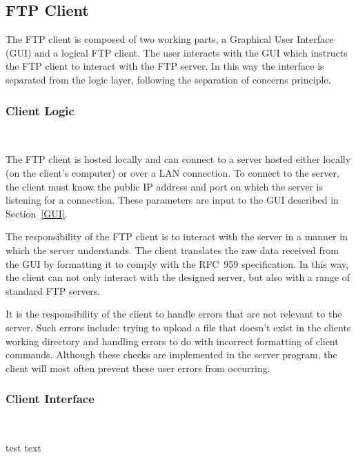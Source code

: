 \documentclass[10pt,twocolumn]{witseiepaper}
\begin{document}
\subsection{FTP Client}

The FTP client is composed of two working parts, a Graphical User Interface (GUI) and a logical FTP client. The user interacts with the GUI which instructs the FTP client to interact with the FTP server. In this way the interface is separated from the logic layer, following the separation of concerns principle.

\vspace*{-2mm}
\subsubsection{Client Logic} $     $

The FTP client is hosted locally and can connect to a server hosted either locally (on the client's computer) or over a LAN connection. To connect to the server, the client must know the public IP address and port on which the server is listening for a connection. These parameters are input to the GUI described in Section~\ref{GUI}.

The responsibility of the FTP client is to interact with the server in a manner in which the server understands. The client translates the raw data received from the GUI by formatting it to comply with the RFC~959 specification. In this way, the client can not only interact with the designed server, but also  with a range of standard FTP servers.

It is the responsibility of the client to handle errors that are not relevant to the server. Such errors include: trying to upload a file that doesn't exist in the clients working directory and handling errors to do with incorrect formatting of client commands. Although these checks are implemented in the server program, the client will most often prevent these user errors from occurring.

\vspace*{-2mm}
\subsubsection{Client Interface} $      $

test text


\end{document}
